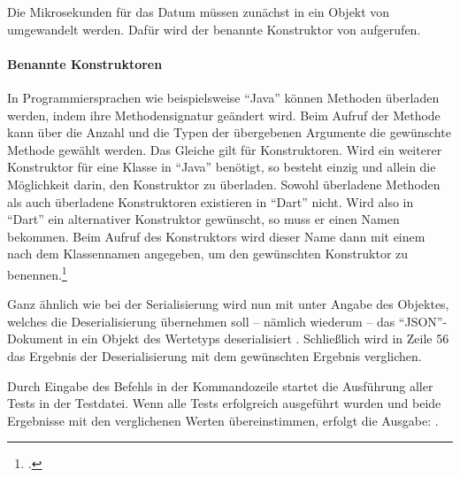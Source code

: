 Die Mikrosekunden für das Datum müssen zunächst in ein Objekt von  umgewandelt werden.
Dafür wird der benannte Konstruktor  von   aufgerufen.

\paragraph{Benannte Konstruktoren} In Programmiersprachen wie beispielsweise \enquote{Java} können Methoden überladen werden, indem ihre Methodensignatur geändert wird.
Beim Aufruf der Methode kann über die Anzahl und die Typen der übergebenen Argumente die gewünschte Methode gewählt werden.
Das Gleiche gilt für Konstruktoren.
Wird ein weiterer Konstruktor für eine Klasse in \enquote{Java} benötigt, so besteht einzig und allein die Möglichkeit darin, den Konstruktor zu überladen.
Sowohl überladene Methoden als auch überladene Konstruktoren existieren in \enquote{Dart} nicht.
Wird also in \enquote{Dart} ein alternativer Konstruktor gewünscht, so muss er einen Namen bekommen.
Beim Aufruf des Konstruktors wird dieser Name dann mit einem  nach dem Klassennamen angegeben, um den gewünschten Konstruktor zu benennen.\footcite[Vgl.][]{NamedConstructors}


Ganz ähnlich wie bei der Serialisierung wird nun mit  unter Angabe des Objektes,
welches die Deserialisierung übernehmen soll -- nämlich wiederum  -- das \enquote{JSON}-Dokument in ein Objekt des Wertetyps  deserialisiert .
Schließlich wird in Zeile 56 das Ergebnis der Deserialisierung mit dem gewünschten Ergebnis verglichen.



Durch Eingabe des Befehls  in der Kommandozeile
startet die Ausführung aller Tests in der Testdatei.
Wenn alle Tests erfolgreich ausgeführt wurden und beide Ergebnisse mit den verglichenen Werten übereinstimmen,
erfolgt die Ausgabe: .